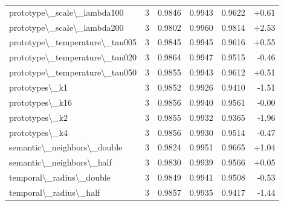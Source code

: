 \documentclass[11pt,a4paper]{article}
\begin{document}
\begin{table}[H]
{{\begin{tabular}{lcrrrr}
prototype\textbackslash{}\_scale\textbackslash{}\_lambda100 & 3 & 0.9846 & 0.9943 & 0.9622 & +0.61 \\
prototype\textbackslash{}\_scale\textbackslash{}\_lambda200 & 3 & 0.9802 & 0.9960 & 0.9814 & +2.53 \\
prototype\textbackslash{}\_temperature\textbackslash{}\_tau005 & 3 & 0.9845 & 0.9945 & 0.9616 & +0.55 \\
prototype\textbackslash{}\_temperature\textbackslash{}\_tau020 & 3 & 0.9864 & 0.9947 & 0.9515 & -0.46 \\
prototype\textbackslash{}\_temperature\textbackslash{}\_tau050 & 3 & 0.9855 & 0.9943 & 0.9612 & +0.51 \\
prototypes\textbackslash{}\_k1 & 3 & 0.9852 & 0.9926 & 0.9410 & -1.51 \\
prototypes\textbackslash{}\_k16 & 3 & 0.9856 & 0.9940 & 0.9561 & -0.00 \\
prototypes\textbackslash{}\_k2 & 3 & 0.9855 & 0.9932 & 0.9365 & -1.96 \\
prototypes\textbackslash{}\_k4 & 3 & 0.9856 & 0.9930 & 0.9514 & -0.47 \\
semantic\textbackslash{}\_neighbors\textbackslash{}\_double & 3 & 0.9824 & 0.9951 & 0.9665 & +1.04 \\
semantic\textbackslash{}\_neighbors\textbackslash{}\_half & 3 & 0.9830 & 0.9939 & 0.9566 & +0.05 \\
temporal\textbackslash{}\_radius\textbackslash{}\_double & 3 & 0.9849 & 0.9941 & 0.9508 & -0.53 \\
temporal\textbackslash{}\_radius\textbackslash{}\_half & 3 & 0.9857 & 0.9935 & 0.9417 & -1.44 \\
\bottomrule
\end{tabular}
}
}
\end{table}
\end{document}
